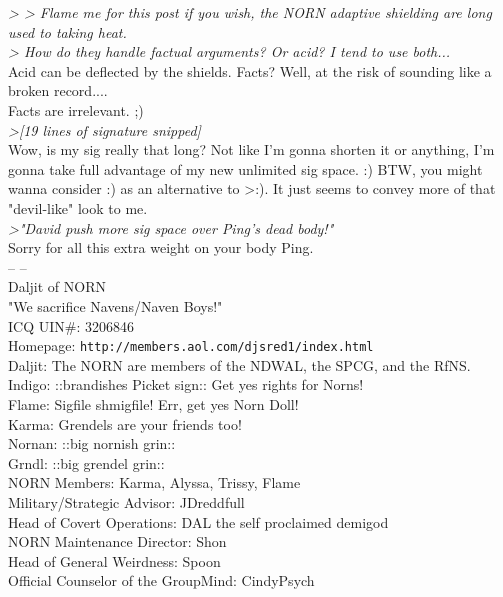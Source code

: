 \documentclass[11pt,twoside,a4paper]{article}
\begin{document}
\begin{multicols*}{2}
\emph{> >  Flame me for this post if you wish, the NORN adaptive shielding are long used to taking heat.}~\\

\emph{> How do they handle factual arguments? Or acid? I tend to use both...}~\\

Acid can be deflected by the shields.  Facts?  Well, at the risk of sounding like a broken record....~\\

Facts are irrelevant.  ;)~\\

\emph{>[19 lines of signature snipped]}~\\

Wow, is my sig really that long?  Not like I'm gonna shorten it or anything, I'm gonna take full advantage of my new unlimited sig space.  :)  BTW, you might wanna consider :) as an alternative to >:).  It just seems to convey more of that "devil-like" look to me.~\\

\emph{>"David push more sig space over Ping's dead body!"}~\\

Sorry for all this extra weight on your body Ping.~\\

-- -- ~\\
Daljit of NORN~\\
"We sacrifice Navens/Naven Boys!"~\\
ICQ UIN\#:  3206846~\\
Homepage:  \texttt{http://members.aol.com/djsred1/index.html}~\\

Daljit:  The NORN are members of the NDWAL, the SPCG, and the RfNS.~\\
Indigo:  ::brandishes Picket sign::  Get yes rights for Norns!~\\
Flame:  Sigfile shmigfile!  Err, get yes Norn Doll!~\\
Karma:  Grendels are your friends too!~\\
Nornan:  ::big nornish grin::~\\
Grndl:  ::big grendel grin::~\\

NORN Members:  Karma, Alyssa, Trissy, Flame~\\
Military/Strategic Advisor:  JDreddfull~\\
Head of Covert Operations:  DAL the self proclaimed demigod~\\
NORN Maintenance Director:  Shon~\\
Head of General Weirdness:  Spoon~\\
Official Counselor of the GroupMind:  CindyPsych~\\


\end{multicols*}
\end{document}
